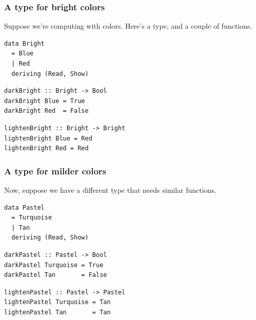 \documentclass{beamer}
\begin{document}
\begin{frame}[fragile]
\frametitle{A type for bright colors}

Suppose we're computing with colors.  Here's a type, and a couple
of functions.

\begin{verbatim}
data Bright
  = Blue
  | Red
  deriving (Read, Show)
\end{verbatim}

\begin{verbatim}
darkBright :: Bright -> Bool
darkBright Blue = True
darkBright Red  = False
\end{verbatim}

\begin{verbatim}
lightenBright :: Bright -> Bright
lightenBright Blue = Red
lightenBright Red = Red
\end{verbatim}

\end{frame}

\begin{frame}[fragile]
\frametitle{A type for milder colors}

Now, suppose we have a different type that needs similar functions.

\begin{verbatim}
data Pastel
  = Turquoise
  | Tan
  deriving (Read, Show)
\end{verbatim}

\begin{verbatim}
darkPastel :: Pastel -> Bool
darkPastel Turquoise = True
darkPastel Tan       = False
\end{verbatim}

\begin{verbatim}
lightenPastel :: Pastel -> Pastel
lightenPastel Turquoise = Tan
lightenPastel Tan       = Tan
\end{verbatim}

\end{frame}
\end{document}
